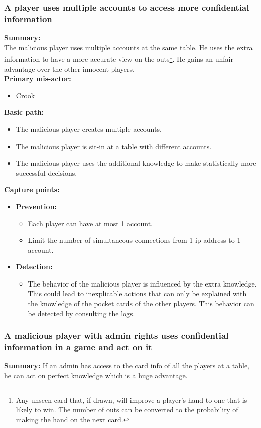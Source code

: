 \documentclass[a4paper,11pt]{report}
\begin{document}
\subsubsection{A player uses multiple accounts to access more confidential information}
\textbf{Summary:} \\
The malicious player uses multiple accounts at the same table. He uses the extra information to  have a more accurate view on the outs\footnote{Any unseen card that, if drawn, will improve a player's hand to one that is likely to win. The number of outs can be converted to the probability of making the hand on the next card.}. He gains an unfair advantage over the other innocent players. \\
\textbf{Primary mis-actor:}
\begin{itemize}
\item Crook
\end{itemize}
\textbf{Basic path:}
\begin{itemize}
\item The malicious player creates multiple accounts. 
\item The malicious player is sit-in at a table with different accounts.
\item The malicious player uses the additional knowledge to make statistically more successful decisions. 
\end{itemize}
\textbf{Capture points:}
\begin{itemize}
\item \textbf{Prevention:}
\begin{itemize}
\item Each player can have at most 1 account.
\item Limit the number of simultaneous connections from 1 ip-address to 1 account.
\end{itemize}
\item \textbf{Detection:}
\begin{itemize}
\item The behavior of the malicious player is influenced by the extra knowledge. This could lead to inexplicable actions that can only be explained with the knowledge of the pocket cards of the other players. This behavior can be detected by consulting the logs.
\end{itemize}
\end{itemize}
\subsubsection{A malicious player with admin rights uses confidential information in a game and act on it}
\textbf{Summary:} If an admin has access to the card info of all the players at a table, he can act on perfect knowledge which is a huge advantage.
\end{document}
